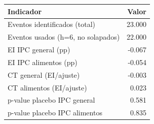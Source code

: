 \begin{tabular}{lr}
\toprule
Indicador & Valor\\
\midrule
Eventos identificados (total) & 23.000\\
Eventos usados (h=6, no solapados) & 22.000\\
EI IPC general (pp) & -0.067\\
EI IPC alimentos (pp) & -0.054\\
CT general (EI/ajuste) & -0.003\\
CT alimentos (EI/ajuste) & 0.023\\
p-value placebo IPC general & 0.581\\
p-value placebo IPC alimentos & 0.835\\
\bottomrule
\end{tabular}

